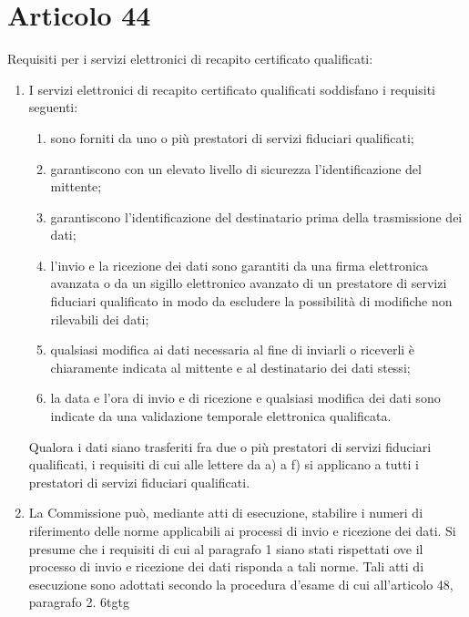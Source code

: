 \section{Articolo 44}\label{sec:articolo44reg9102014}
Requisiti per i servizi elettronici di recapito certificato qualificati:
\begin{enumerate}
	\item I servizi elettronici di recapito certificato qualificati soddisfano i requisiti seguenti:
	\begin{enumerate}
		\item sono forniti da uno o più prestatori di servizi fiduciari qualificati;
		\item garantiscono con un elevato livello di sicurezza l’identificazione del mittente;
		\item garantiscono l’identificazione del destinatario prima della trasmissione dei dati;
		\item 	
		l’invio e la ricezione dei dati sono garantiti da una firma elettronica avanzata o da un sigillo elettronico avanzato di un prestatore di servizi fiduciari qualificato in modo da escludere la possibilità di modifiche non rilevabili dei dati;
		\item qualsiasi modifica ai dati necessaria al fine di inviarli o riceverli è chiaramente indicata al mittente e al destinatario dei dati stessi;
		\item la data e l’ora di invio e di ricezione e qualsiasi modifica dei dati sono indicate da una validazione temporale elettronica qualificata.
	\end{enumerate}
Qualora i dati siano trasferiti fra due o più prestatori di servizi fiduciari qualificati, i requisiti di cui alle lettere da a) a f) si applicano a tutti i prestatori di servizi fiduciari qualificati.
\item La Commissione può, mediante atti di esecuzione, stabilire i numeri di riferimento delle norme applicabili ai processi di invio e ricezione dei dati. Si presume che i requisiti di cui al paragrafo 1 siano stati rispettati ove il processo di invio e ricezione dei dati risponda a tali norme. Tali atti di esecuzione sono adottati secondo la procedura d’esame di cui all’articolo 48, paragrafo 2.
6tgtg \end{enumerate}
